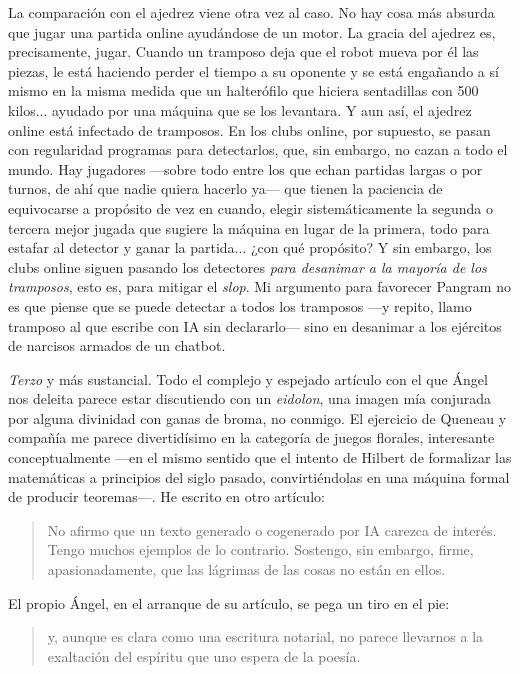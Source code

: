 \documentclass[11pt,a4paper]{article}
\begin{document}
La comparación con el ajedrez viene otra vez al caso. No hay cosa más absurda que jugar una partida online ayudándose de un motor. La gracia del ajedrez es, precisamente, jugar. Cuando un tramposo deja que el robot mueva por él las piezas, le está haciendo perder el tiempo a su oponente y se está engañando a sí mismo en la misma medida que un halterófilo que hiciera sentadillas con 500 kilos... ayudado por una máquina que se los levantara. Y aun así, el ajedrez online está infectado de tramposos. En los clubs online, por supuesto, se pasan con regularidad programas para detectarlos, que, sin embargo, no cazan a todo el mundo. Hay jugadores ---sobre todo entre los que echan partidas largas o por turnos, de ahí que nadie quiera hacerlo ya--- que tienen la paciencia de equivocarse a propósito de vez en cuando, elegir sistemáticamente la segunda o tercera mejor jugada que sugiere la máquina en lugar de la primera, todo para estafar al detector y ganar la partida... ¿con qué propósito? Y sin embargo, los clubs online siguen pasando los detectores \emph{para desanimar a la mayoría de los tramposos}, esto es, para mitigar el \emph{slop}. Mi argumento para favorecer Pangram no es que piense que se puede detectar a todos los tramposos ---y repito, llamo tramposo al que escribe con IA sin declararlo--- sino en desanimar a los ejércitos de narcisos armados de un chatbot.

\emph{Terzo} y más sustancial. Todo el complejo y espejado artículo con el que Ángel nos deleita parece estar discutiendo con un \emph{eidolon}, una imagen mía conjurada por alguna divinidad con ganas de broma, no conmigo. El ejercicio de Queneau y compañía me parece divertidísimo en la categoría de juegos florales, interesante conceptualmente ---en el mismo sentido que el intento de Hilbert de formalizar las matemáticas a principios del siglo pasado, convirtiéndolas en una máquina formal de producir teoremas---. He escrito en otro artículo:

\begin{quotation}
No afirmo que un texto generado o cogenerado por IA carezca de interés. Tengo muchos ejemplos de lo contrario. Sostengo, sin embargo, firme, apasionadamente, que las lágrimas de las cosas no están en ellos.
\end{quotation}

El propio Ángel, en el arranque de su artículo, se pega un tiro en el pie:

\begin{quotation}
y, aunque es clara como una escritura notarial, no parece llevarnos a la exaltación del espíritu que uno espera de la poesía.
\end{quotation}
\end{document}

